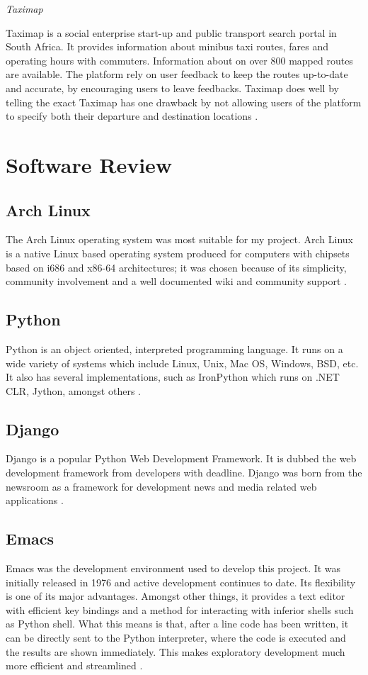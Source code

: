 \textit{Taximap}

Taximap is a social enterprise start-up and public transport search portal in South Africa. It provides information about minibus taxi routes, fares and operating hours with commuters. Information about on over 800 mapped routes are available. The platform rely on user feedback to keep the routes up-to-date and accurate, by encouraging users to leave feedbacks. Taximap does well by telling the exact Taximap has one drawback by not allowing users of the platform to specify both their departure and destination locations \citep{neumann_toward_2015}.

\section{Software Review}

\subsection{Arch Linux}
The Arch Linux operating system was most suitable for my project. Arch Linux is a native Linux based operating system produced for computers with chipsets based on i686 and x86-64 architectures; it was chosen because of its simplicity, community involvement and a well documented wiki and community support \citep{vinet2014arch}.

\subsection{Python}
Python is an object oriented, interpreted programming language. It runs on a wide variety of systems which include Linux, Unix, Mac OS, Windows, BSD, etc. It also has several implementations, such as IronPython which runs on .NET CLR, Jython, amongst others \citep{van2007python}. 

\subsection{Django}
Django is a popular Python Web Development Framework. It is dubbed the web development framework from developers with deadline. Django was born from the newsroom as a framework for development news and media related web applications \citep{holovaty2009definitive}.

\subsection{Emacs}
Emacs was the development environment used to develop this project. It was initially released in 1976 and active development continues to date. Its flexibility is one of its major advantages. Amongst other things, it provides a text editor with efficient key bindings and a method for interacting with inferior shells such as Python shell. What this means is that, after a line code has been written, it can be directly sent to the Python interpreter, where the code is executed and the results are shown immediately. This makes exploratory development much more efficient and streamlined \citep{stallman1981emacs}. 


